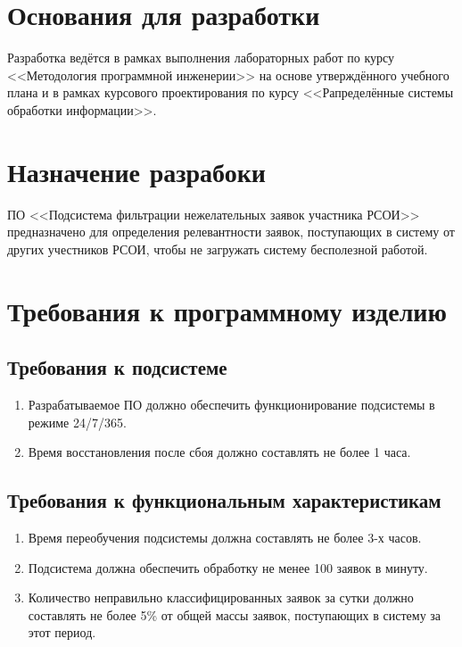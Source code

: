 \documentclass[utf8x, 12pt]{G7-32}
\begin{document}
\nobreakingbeforechapters
\chapter{Основания для разработки}

Разработка ведётся в рамках выполнения лабораторных работ по курсу <<Методология
программной инженерии>> на основе утверждённого учебного плана и в рамках курсового
проектирования по курсу <<Рапределённые системы обработки информации>>.

\chapter{Назначение разрабоки}

ПО <<Подсистема фильтрации нежелательных заявок участника РСОИ>>  предназначено
для определения релевантности заявок, поступающих в систему от других учестников
РСОИ, чтобы не загружать систему бесполезной работой.

\chapter{Требования к программному изделию}

\section{Требования к подсистеме}

\begin{enumerate}
        \item Разрабатываемое ПО должно обеспечить функционирование подсистемы
        в режиме 24/7/365.
        \item Время восстановления после сбоя должно составлять не более 1 часа.
\end{enumerate}

\section{Требования к функциональным характеристикам}

\begin{enumerate}
        \item Время переобучения подсистемы должна составлять не более 3-х часов.
        \item Подсистема должна обеспечить обработку не  менее 100 заявок в минуту.
        \item Количество неправильно классифицированных заявок за сутки должно 
        составлять не более 5\% от общей массы заявок, поступающих в систему за этот 
        период.
\end{enumerate}
\end{document}
